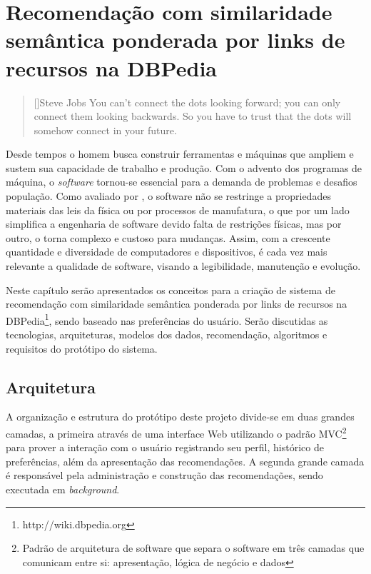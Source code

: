 \chapter{Recomendação com similaridade semântica ponderada por links de recursos na DBPedia}
\label{cap:proposal}

\begin{quotation}[]{Steve Jobs}
You can't connect the dots looking forward; you can only connect them looking backwards. So you have to trust that the dots will somehow connect in your future.
\end{quotation}

Desde tempos o homem busca construir ferramentas e máquinas que ampliem e sustem sua capacidade de trabalho e produção. Com o advento dos programas de máquina, o \textit{software} tornou-se essencial para a demanda de problemas e desafios população. Como avaliado por \citep{Sommerville2010}, o software não se restringe a propriedades materiais das leis da física ou por processos de manufatura, o que por um lado simplifica a engenharia de software devido falta de restrições físicas, mas por outro, o torna complexo e custoso para mudanças. Assim, com a crescente quantidade e diversidade de computadores e dispositivos, é cada vez mais relevante a qualidade de software, visando a legibilidade, manutenção e evolução.

Neste capítulo serão apresentados os conceitos para a criação de sistema de recomendação com similaridade semântica ponderada por links de recursos na DBPedia\footnote{http://wiki.dbpedia.org}, sendo baseado nas preferências do usuário. Serão discutidas as tecnologias, arquiteturas, modelos dos dados, recomendação, algoritmos e requisitos do protótipo do sistema.

\section{Arquitetura}

A organização e estrutura do protótipo deste projeto divide-se em duas grandes camadas, a primeira através de uma interface Web utilizando o padrão \ac{MVC}\footnote{Padrão de arquitetura de software que separa o software em três camadas que comunicam entre si: apresentação, lógica de negócio e dados} para prover a interação com o usuário registrando seu perfil, histórico de preferências, além da apresentação das recomendações. A segunda grande camada é responsável pela administração e construção das recomendações, sendo executada em \textit{background}.

